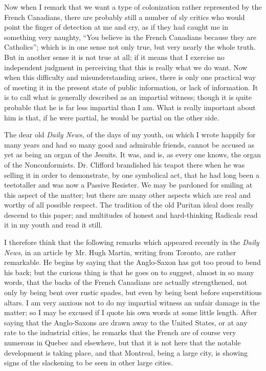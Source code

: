 \documentclass{book}
\begin{document}
Now when I remark that we want a type of colonization rather represented by the French Canadians, there are probably still a number of sly critics who would point the finger of detection at me and cry, as if they had caught me in something very naughty, “You believe in the French Canadians because they are Catholics”; which is in one sense not only true, but very nearly the whole truth. But in another sense it is not true at all; if it means that I exercise no independent judgment in perceiving that this is really what we do want. Now when this difficulty and misunderstanding arises, there is only one practical way of meeting it in the present state of public information, or lack of information. It is to call what is generally described as an impartial witness; though it is quite probable that he is far less impartial than I am. What is really important about him is that, if he were partial, he would be partial on the other side.

The dear old \emph{Daily News,} of the days of my youth, on which I wrote happily for many years and had so many good and admirable friends, cannot be accused as yet as being an organ of the Jesuits. It was, and is, as every one knows, the organ of the Nonconformists. Dr. Clifford brandished his teapot there when he was selling it in order to demonstrate, by one symbolical act, that he had long been a teetotaller and was now a Passive Resister. We may be pardoned for smiling at this aspect of the matter; but there are many other aspects which are real and worthy of all possible respect. The tradition of the old Puritan ideal does really descend to this paper; and multitudes of honest and hard-thinking Radicals read it in my youth and read it still.

I therefore think that the following remarks which appeared recently in the \emph{Daily News,} in an article by Mr. Hugh Martin, writing from Toronto, are rather remarkable. He begins by saying that the Anglo-Saxon has got too proud to bend his back; but the curious thing is that he goes on to suggest, almost in so many words, that the backs of the French Canadians are actually strengthened, not only by being bent over rustic spades, but even by being bent before superstitious altars. I am very anxious not to do my impartial witness an unfair damage in the matter; so I may be excused if I quote his own words at some little length. After saying that the Anglo-Saxons are drawn away to the United States, or at any rate to the industrial cities, he remarks that the French are of course very numerous in Quebec and elsewhere, but that it is not here that the notable development is taking place, and that Montreal, being a large city, is showing signs of the slackening to be seen in other large cities.
\end{document}
